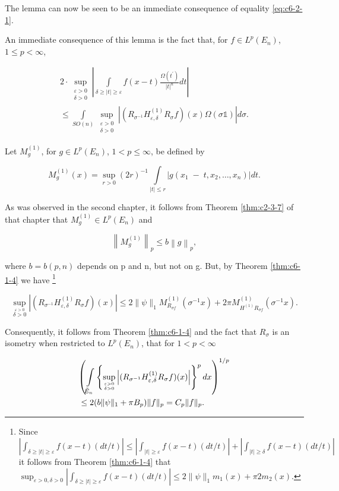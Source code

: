 The lemma can now be seen to be an immediate consequence of equality \eqref{eq:c6-2-1}.

An immediate consequence of this lemma is the fact that, for $f \in L^p(E_n)$, $1 \leq p < \infty$,

\begin{equation}\label{eq:c6-2-3}
\begin{aligned}2\cdot\sup_{\substack{\varepsilon>0\\ \delta>0}}\left|\int\limits_{\delta\geq|t|\geq\varepsilon}f(x-t)\frac{\Omega(t^{\prime})}{|t|^{n}}dt\right|\\\leq\int\limits_{SO(n)}\sup_{\substack{\varepsilon>0\\ \delta>0}}\left|(R_{\sigma^{-1}}H^{(1)}_{\varepsilon,\delta}R_{\sigma}f)(x)\Omega(\sigma\mathbb{1})\right|d\sigma.\end{aligned}
\end{equation}

Let $M_g^{(1)}$, for $g \in L^p(E_n)$, $1 < p \leq \infty$, be defined by

\[
M_{g}^{(1)}(x)=\sup_{r>0}\left(2r\right)^{-1}\int\limits_{|t|\leq r}\left|g(x_{1}\;-\;t,x_{2},\ldots,x_{n})\right|d t.
\]

As was observed in the second chapter, it follows from Theorem \ref{thm:c2-3-7} of that chapter that $M_g^{(1)} \in L^p(E_n)$ and

\[
\left\|M_{g}^{(1)}\right\|_{p}\leq b\left\|g\right\|_{p},
\]

where $b = b(p, n)$ depends on p and n, but not on g. But, by Theorem \ref{thm:c6-1-4} we have \footnote{Since $|\int_{\delta\geq|t|\geq\varepsilon}f(x-t)(dt/t)|\leq|\int_{|t|\geq\varepsilon}f(x-t)(dt/t)|+|\int_{|t|\geq\delta}f(x-t)(dt/t)|$ it follows from Theorem \ref{thm:c6-1-4} that $\sup_{\varepsilon>0,\delta>0}|\int_{\delta\geq|t|\geq\varepsilon}f(x-t)(dt/t)|\leq2\|\psi\|_{1}m_1(x)+\pi2m_2(x)$.}

\[
\sup_{\stackrel{\varepsilon>0}{\delta>0}}\left|(R_{\sigma^{-1}}H_{\varepsilon,\delta}^{(1)}R_{\sigma}f)(x)\right|\leq2\|\psi\|_{1}M_{R_{\sigma f}}^{(1)}(\sigma^{-1}x)+2\pi M_{H^{(1)}R_{\sigma f}}^{(1)}(\sigma^{-1}x).
\]

Consequently, it follows from Theorem \ref{thm:c6-1-4} and the fact that $R_\sigma$ is an isometry when restricted to $L^p(E_n)$, that for $1 < p < \infty$

\begin{equation}\label{eq:c6-2-4}
\begin{aligned}&{\left(\intop_{\tilde{E}_{n}}\left\{\sup_{\varepsilon>0\atop\delta>0}\left|(R_{\sigma^{-1}}H_{\varepsilon,\delta}^{(1)}R_{\sigma}f)(x)\right|\right\}^{p}d x\right)^{1/p}}\\&\leq2(b\|\psi\|_{1}+\pi B_{p})\|f\|_{p}=C_{p}\|f\|_{p}.\end{aligned}
\end{equation}

